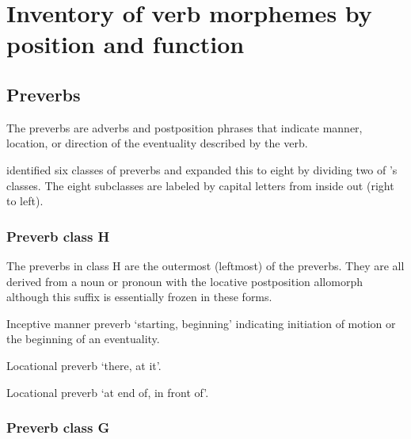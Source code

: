 
\section{Inventory of verb morphemes by position and function}\label{sec:inventory}

\subsection{Preverbs}\label{sec:inventory-preverb}

The preverbs are adverbs and postposition phrases that indicate manner, location, or direction
	of the eventuality described by the verb.

\textcite[132–134]{leer:1991} identified six classes of preverbs and \textcite[686]{crippen:2019} expanded this to eight by dividing two of \citeauthor{leer:1991}’s classes.
The eight subclasses are labeled by capital letters from inside out (right to left).

\subsubsection{Preverb class H}\label{sec:inventory-preverb-H}

The preverbs in class H are the outermost (leftmost) of the preverbs.
They are all derived from a noun or pronoun with the locative postposition allomorph 
	although this suffix is essentially frozen in these forms.

\begin{morphdesc}
\item[\X{g̱unayéi=}]
\item[\X{g̱unéi=}]
\item[\X{g̱unyéi=}]
	Inceptive manner preverb ‘starting, beginning’ indicating initiation of motion
	or the beginning of an eventuality.

\item[\X{áa=}]
	Locational preverb ‘there, at it’.

\item[\X{shóo=}]
	Locational preverb ‘at end of, in front of’.
\end{morphdesc}

\subsubsection{Preverb class G}\label{sec:inventory-preverb-G}

